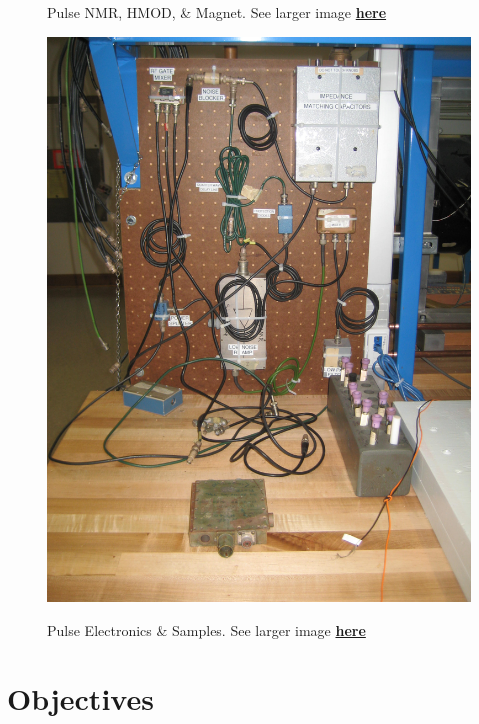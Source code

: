 \documentclass{../lab}
\begin{document}
\begin{figure}[H]
\begin{minipage}{0.36\textwidth}
    \caption{Pulse NMR, HMOD, \& Magnet. See larger image \href{http://experimentationlab.berkeley.edu/sites/default/files/images/PNMR_3494.jpg}{\textbf{here}}}
\end{minipage}
\begin{minipage}{0.20\textwidth}
    \href{http://experimentationlab.berkeley.edu/sites/default/files/images/PNMR_3495.jpg}{\includegraphics[width=\linewidth,keepaspectratio]{images/PNMR_3495.jpg}}
    \caption{Pulse Electronics \& Samples. See larger image \href{http://experimentationlab.berkeley.edu/sites/default/files/images/PNMR_3495.jpg}{\textbf{here}}}
\end{minipage}
\end{figure}

\section{Objectives}
\end{document}
